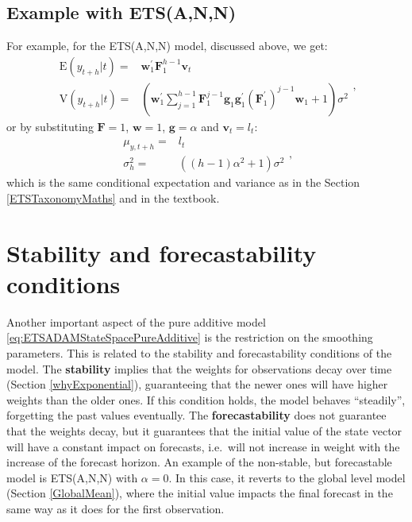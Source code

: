 \documentclass[
]{book}
\theoremstyle{definition}
\theoremstyle{definition}
\theoremstyle{definition}
\theoremstyle{definition}
\theoremstyle{remark}
\begin{document}
\hypertarget{example-with-etsann}{%
\subsection{Example with ETS(A,N,N)}\label{example-with-etsann}}

For example, for the ETS(A,N,N) model, discussed above, we get:
\begin{equation}
  \begin{aligned}
    \text{E}(y_{t+h}|t) = & \mathbf{w}_{1}^\prime \mathbf{F}_{1}^{h-1} \mathbf{v}_{t} \\
    \text{V}(y_{t+h}|t) = & \left(\mathbf{w}_{1}^\prime \sum_{j=1}^{h-1} \mathbf{F}_{1}^{j-1} \mathbf{g}_{1} \mathbf{g}^\prime_{1} (\mathbf{F}_{1}^\prime)^{j-1} \mathbf{w}_{1} + 1 \right) \sigma^2
  \end{aligned},
  \label{eq:ETSADAMStateSpaceANNRecursionMeanAndVarianceGeneral}
\end{equation}
or by substituting \(\mathbf{F}=1\), \(\mathbf{w}=1\), \(\mathbf{g}=\alpha\) and \(\mathbf{v}_t=l_t\):
\begin{equation}
  \begin{aligned}
    \mu_{y,t+h} = & l_{t} \\
    \sigma^2_{h} = & \left((h-1) \alpha^2 + 1 \right) \sigma^2
  \end{aligned},
  \label{eq:ETSADAMStateSpaceANNRecursionMeanAndVariance}
\end{equation}
which is the same conditional expectation and variance as in the Section \ref{ETSTaxonomyMaths} and in the \citet{Hyndman2008b} textbook.

\hypertarget{stabilityConditionAdditiveError}{%
\section{Stability and forecastability conditions}\label{stabilityConditionAdditiveError}}

Another important aspect of the pure additive model \eqref{eq:ETSADAMStateSpacePureAdditive} is the restriction on the smoothing parameters. This is related to the stability and forecastability conditions of the model. The \textbf{stability} implies that the weights for observations decay over time (Section \ref{whyExponential}), guaranteeing that the newer ones will have higher weights than the older ones. If this condition holds, the model behaves ``steadily'', forgetting the past values eventually. The \textbf{forecastability} does not guarantee that the weights decay, but it guarantees that the initial value of the state vector will have a constant impact on forecasts, i.e.~will not increase in weight with the increase of the forecast horizon. An example of the non-stable, but forecastable model is ETS(A,N,N) with \(\alpha=0\). In this case, it reverts to the global level model (Section \ref{GlobalMean}), where the initial value impacts the final forecast in the same way as it does for the first observation.
\end{document}
